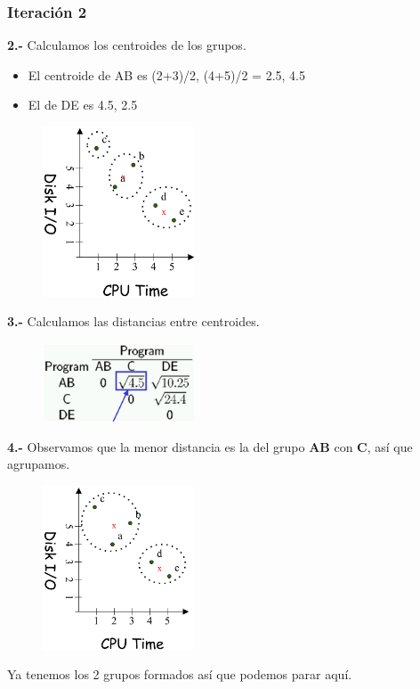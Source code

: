 \subsubsection{Iteración 2}
\textbf{2.- }Calculamos los centroides de los grupos.
\begin{itemize}
    \item El centroide de AB es {(2+3)/2, (4+5)/2} = {2.5, 4.5}
    \item El de DE es {4.5, 2.5}
\end{itemize}
\begin{figure}[H]
    \centering
    \includegraphics[width=0.4\textwidth]{Images/MST2.png}
\end{figure}
\textbf{3.- }Calculamos las distancias entre centroides.
\begin{figure}[H]
    \centering
    \includegraphics[width=0.4\textwidth]{Images/MST-D2.png}
\end{figure}
\textbf{4.- }Observamos que la menor distancia es la del grupo \textbf{AB} con \textbf{C}, así que agrupamos.
\begin{figure}[H]
    \centering
    \includegraphics[width=0.4\textwidth]{Images/MST3.png}
\end{figure}
Ya tenemos los 2 grupos formados así que podemos parar aquí.\\

